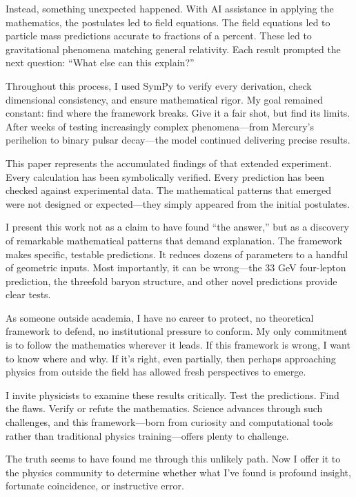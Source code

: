 Instead, something unexpected happened. With AI assistance in applying the mathematics, the postulates led to field equations. The field equations led to particle mass predictions accurate to fractions of a percent. These led to gravitational phenomena matching general relativity. Each result prompted the next question: ``What else can this explain?''

Throughout this process, I used SymPy to verify every derivation, check dimensional consistency, and ensure mathematical rigor. My goal remained constant: find where the framework breaks. Give it a fair shot, but find its limits. After weeks of testing increasingly complex phenomena---from Mercury's perihelion to binary pulsar decay---the model continued delivering precise results.

This paper represents the accumulated findings of that extended experiment. Every calculation has been symbolically verified. Every prediction has been checked against experimental data. The mathematical patterns that emerged were not designed or expected---they simply appeared from the initial postulates.

I present this work not as a claim to have found ``the answer,'' but as a discovery of remarkable mathematical patterns that demand explanation. The framework makes specific, testable predictions. It reduces dozens of parameters to a handful of geometric inputs. Most importantly, it can be wrong---the 33 GeV four-lepton prediction, the threefold baryon structure, and other novel predictions provide clear tests.

As someone outside academia, I have no career to protect, no theoretical framework to defend, no institutional pressure to conform. My only commitment is to follow the mathematics wherever it leads. If this framework is wrong, I want to know where and why. If it's right, even partially, then perhaps approaching physics from outside the field has allowed fresh perspectives to emerge.

I invite physicists to examine these results critically. Test the predictions. Find the flaws. Verify or refute the mathematics. Science advances through such challenges, and this framework---born from curiosity and computational tools rather than traditional physics training---offers plenty to challenge.

The truth seems to have found me through this unlikely path. Now I offer it to the physics community to determine whether what I've found is profound insight, fortunate coincidence, or instructive error.

